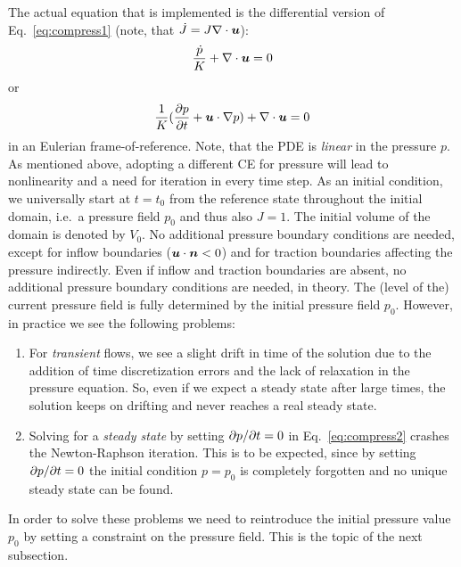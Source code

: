 The actual equation that is implemented is the differential version of Eq.~\eqref{eq:compress1} (note, that
$\dot J=J\nabla\cdot\boldsymbol{u}$):
\[
   \frac{\dot p}K+\nabla\cdot\boldsymbol{u} = 0
\]
or
\begin{equation}
   \frac1K(\dfrac{\partial p}{\partial t}+\boldsymbol{u}\cdot\nabla p)+\nabla\cdot\boldsymbol{u} = 0
   \label{eq:compress2}
\end{equation}
in an Eulerian frame-of-reference. Note, that the PDE is \emph{linear} in the pressure $p$. As mentioned above, adopting a different CE for pressure will lead to nonlinearity and a need for iteration in every time step.
As an initial condition, we universally start at $t=t_0$ from the reference state throughout the initial domain, i.e.\ a pressure field $p_0$ and thus also $J=1$. The initial volume of the domain is denoted by $V_0$. No additional pressure boundary conditions are needed, except for inflow boundaries ($\boldsymbol{u}\cdot\boldsymbol{n}<0$) and for traction boundaries affecting the pressure indirectly. Even if inflow and traction boundaries are absent, no additional pressure boundary conditions are needed, in theory. The (level of the) current pressure field is fully determined by the initial pressure field $p_0$. However, in practice we see the following problems:
\begin{enumerate}
 \item For \emph{transient} flows, we see a slight drift in time of the solution due to the addition of time discretization errors and the lack of relaxation in the pressure equation. So, even if we expect a steady state after large times, the solution keeps on drifting and never reaches a real steady state.
 \item Solving for a \emph{steady state} by setting $\partial p/\partial t=0$ in Eq.~\eqref{eq:compress2} crashes the Newton-Raphson iteration. This is to be expected, since by setting $\partial p/\partial t=0$ the initial condition $p=p_0$ is completely forgotten and no unique steady state can be found.
\end{enumerate}
In order to solve these problems we need to reintroduce the initial pressure value $p_0$ by setting a constraint on the pressure field. This is the topic of the next subsection.

